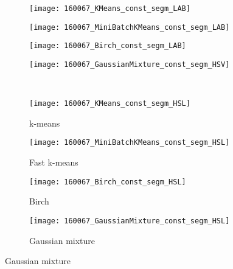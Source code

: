\begin{figure}[!ht]
          
    \begin{subfigure}[b]{\textwidth+20pt\relax}
    	\centering
    	\texttt{[image: 160067\_KMeans\_const\_segm\_LAB]} 
    \end{subfigure}      
    \begin{subfigure}[b]{0.23\textwidth}
    	\centering
        \texttt{[image: 160067\_MiniBatchKMeans\_const\_segm\_LAB]}
    \end{subfigure}
    \begin{subfigure}[b]{0.23\textwidth}
    	\centering
        \texttt{[image: 160067\_Birch\_const\_segm\_LAB]}
    \end{subfigure}
    \begin{subfigure}[b]{0.23\textwidth}
    	\centering
        \texttt{[image: 160067\_GaussianMixture\_const\_segm\_HSV]}
    \end{subfigure} \\ \vspace{-5pt}
    
           
    \begin{subfigure}[b]{\textwidth+20pt\relax}
    	\centering
    	\texttt{[image: 160067\_KMeans\_const\_segm\_HSL]} 
    	\caption{k-means}
    \end{subfigure}      
    \begin{subfigure}[b]{0.23\textwidth}
    	\centering
        \texttt{[image: 160067\_MiniBatchKMeans\_const\_segm\_HSL]}
        \caption{Fast k-means}
    \end{subfigure}
    \begin{subfigure}[b]{0.23\textwidth}
    	\centering
        \texttt{[image: 160067\_Birch\_const\_segm\_HSL]}
        \caption{Birch}
    \end{subfigure}
    \begin{subfigure}[b]{0.23\textwidth}
    	\centering
        \texttt{[image: 160067\_GaussianMixture\_const\_segm\_HSL]}
        \caption{Gaussian mixture}
    \end{subfigure} 
    

\end{figure}
